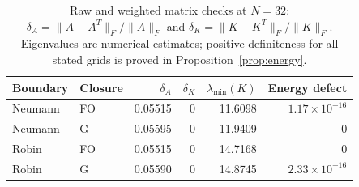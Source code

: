 \begin{table}[htbp]
\centering
\footnotesize
\setlength{\tabcolsep}{4pt}
\begin{tabular}{llrrrr}
\toprule
Boundary & Closure & $\delta_A$ & $\delta_K$ & $\lambda_{\min}(K)$ & Energy defect \\
\midrule
Neumann & FO & 0.05515 & $0$ & 11.6098 & $1.17\times10^{-16}$ \\
Neumann & G & 0.05595 & $0$ & 11.9409 & $0$ \\
Robin & FO & 0.05515 & $0$ & 14.7168 & $0$ \\
Robin & G & 0.05590 & $0$ & 14.8745 & $2.33\times10^{-16}$ \\
\bottomrule
\end{tabular}
\caption{Raw and weighted matrix checks at $N=32$: $\delta_A=\|A-A^T\|_F/\|A\|_F$ and $\delta_K=\|K-K^T\|_F/\|K\|_F$. Eigenvalues are numerical estimates; positive definiteness for all stated grids is proved in Proposition~\ref{prop:energy}.}
\label{tab:matrix-structure}
\end{table}
